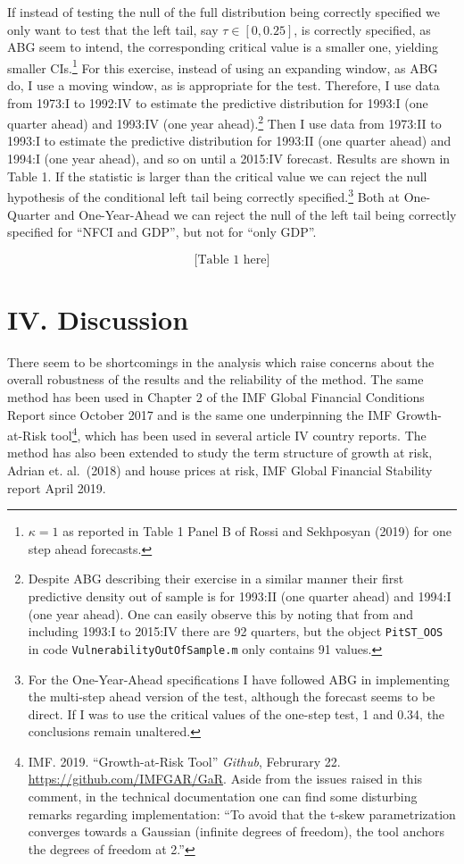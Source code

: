 \documentclass[12pt,]{article}
\let\rmarkdownfootnote\footnote%
\def\footnote{\protect\rmarkdownfootnote}
\begin{document}
If instead of testing the null of the full distribution being correctly
specified we only want to test that the left tail, say
\(\tau \in [0, 0.25]\), is correctly specified, as ABG seem to intend,
the corresponding critical value is a smaller one, yielding smaller
CIs.\footnote{$\kappa = 1$  as reported in Table 1 Panel B of Rossi and Sekhposyan (2019) for one step ahead forecasts.}
For this exercise, instead of using an expanding window, as ABG do, I
use a moving window, as is appropriate for the test. Therefore, I use
data from 1973:I to 1992:IV to estimate the predictive distribution for
1993:I (one quarter ahead) and 1993:IV (one year
ahead).\footnote{Despite ABG describing their exercise in a similar manner their first predictive density out of sample is for 1993:II (one quarter ahead) and 1994:I (one year ahead). One can easily observe this by noting that from and including 1993:I to 2015:IV there are 92 quarters, but the object \texttt{PitST\_OOS} in code \texttt{VulnerabilityOutOfSample.m} only contains 91 values.}
Then I use data from 1973:II to 1993:I to estimate the predictive
distribution for 1993:II (one quarter ahead) and 1994:I (one year
ahead), and so on until a 2015:IV forecast. Results are shown in Table
1. If the statistic is larger than the critical value we can reject the
null hypothesis of the conditional left tail being correctly
specified.\footnote{For the One-Year-Ahead specifications I have followed ABG in implementing the multi-step ahead version of the test, although the forecast seems to be direct. If I was to use the critical values of the one-step test, 1 and 0.34, the conclusions remain unaltered.}
Both at One-Quarter and One-Year-Ahead we can reject the null of the
left tail being correctly specified for ``NFCI and GDP'', but not for
``only GDP''.

\[
\text{[Table 1 here]}
\]

\hypertarget{iv.-discussion}{%
\section{IV. Discussion}\label{iv.-discussion}}

There seem to be shortcomings in the analysis which raise concerns about
the overall robustness of the results and the reliability of the method.
The same method has been used in Chapter 2 of the IMF Global Financial
Conditions Report since October 2017 and is the same one underpinning
the IMF Growth-at-Risk
tool\footnote{IMF. 2019. “Growth-at-Risk Tool” \textit{Github}, Februrary 22. \url{https://github.com/IMFGAR/GaR}. Aside from the issues raised in this comment, in the technical documentation one can find some disturbing remarks regarding implementation: “To avoid that the t-skew parametrization converges towards a Gaussian (infinite degrees of freedom), the tool anchors the degrees of freedom at 2.”},
which has been used in several article IV country reports. The method
has also been extended to study the term structure of growth at risk,
Adrian et. al.~(2018) and house prices at risk, IMF Global Financial
Stability report April 2019.
\end{document}
